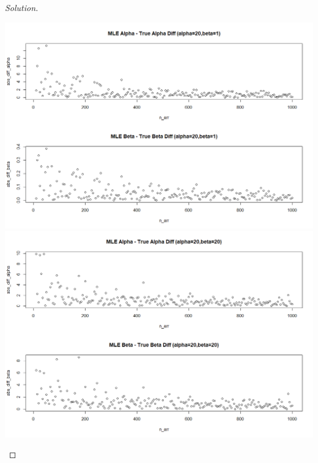 \documentclass{article}
\newenvironment{solution}
  {\renewcommand\qedsymbol{$\blacksquare$}\begin{proof}[Solution]$ $}
  {\end{proof}}
\begin{document}
\begin{Exercise}
\begin{solution}
\begin{enumerate}[label=(\roman*)]
                      \includegraphics[scale=0.25]{abs_diff_3.png}
                      \includegraphics[scale=0.25]{abs_diff_4.png}
                  \fi


        \end{enumerate}
    \end{solution}
\end{Exercise}
\end{document}
